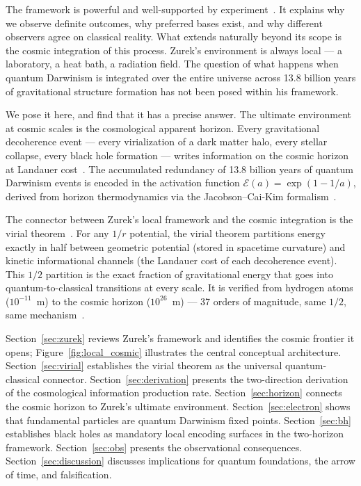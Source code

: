 \documentclass[12pt,a4paper]{article}
\begin{document}
The framework is powerful and well-supported by
experiment~\citep{Joos1985,Schlosshauer2005}. It explains why we observe
definite outcomes, why preferred bases exist, and why different observers
agree on classical reality. What extends naturally beyond its scope is the cosmic integration
of this process. Zurek's environment is always local --- a laboratory, a heat
bath, a radiation field. The question of what happens when quantum Darwinism
is integrated over the entire universe across 13.8 billion years of
gravitational structure formation has not been posed within his framework.

We pose it here, and find that it has a precise answer. The ultimate
environment at cosmic scales is the cosmological apparent horizon. Every
gravitational decoherence event --- every virialization of a dark matter halo,
every stellar collapse, every black hole formation --- writes information on
the cosmic horizon at Landauer cost~\citep{Landauer1961}. The accumulated
redundancy of 13.8 billion years of quantum Darwinism events is encoded
in the activation function $\mathcal{E}(a) = \exp(1 - 1/a)$, derived from
horizon thermodynamics via the Jacobson--Cai-Kim
formalism~\citep{Jacobson1995,CaiKim2005}.

The connector between Zurek's local framework and the cosmic integration is
the virial theorem~\citep{Clausius1870}. For any $1/r$ potential, the virial
theorem partitions energy exactly in half between geometric potential (stored
in spacetime curvature) and kinetic informational channels (the Landauer cost
of each decoherence event). This $1/2$ partition is the exact fraction of
gravitational energy that goes into quantum-to-classical transitions at every
scale. It is verified from hydrogen atoms ($10^{-11}$~m) to the cosmic horizon
($10^{26}$~m) --- 37 orders of magnitude, same $1/2$, same
mechanism~\citep{IAM_virial}.

Section~\ref{sec:zurek} reviews Zurek's framework and identifies the
cosmic frontier it opens; Figure~\ref{fig:local_cosmic} illustrates
the central conceptual architecture. Section~\ref{sec:virial} establishes
the virial theorem as the universal quantum-classical connector.
Section~\ref{sec:derivation} presents the two-direction derivation of the
cosmological information production rate. Section~\ref{sec:horizon} connects
the cosmic horizon to Zurek's ultimate environment. Section~\ref{sec:electron}
shows that fundamental particles are quantum Darwinism fixed points.
Section~\ref{sec:bh} establishes black holes as mandatory local encoding
surfaces in the two-horizon framework. Section~\ref{sec:obs} presents the
observational consequences. Section~\ref{sec:discussion} discusses
implications for quantum foundations, the arrow of time, and falsification.
\end{document}
